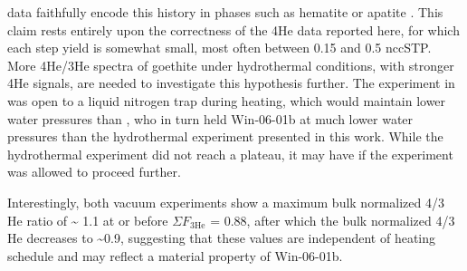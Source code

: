 data faithfully encode this history in phases such as hematite or apatite
\citep{farleymckeon2015,shuster2004}. This claim rests entirely upon the correctness
of the 4He data reported here, for which each step yield is somewhat small, most often
between 0.15 and 0.5 nccSTP. More 4He/3He spectra of goethite under hydrothermal
conditions, with stronger 4He signals, are needed to investigate this hypothesis
further. The experiment in \citet{farley2024} was open to a liquid nitrogen trap during heating, which would
maintain lower water pressures than \citet{monteiro2017}, who in turn held
Win-06-01b at much lower water pressures than the hydrothermal
experiment presented in this work. While the hydrothermal experiment did
not reach a plateau, it may have if the experiment was allowed to
proceed further.

Interestingly, both vacuum experiments show a maximum bulk normalized
4/3 He ratio of \textasciitilde{} 1.1 at or before $\Sigma F_{3\mathrm{He}}$ = 0.88, after
which the bulk normalized 4/3 He decreases to \textasciitilde0.9,
suggesting that these values are independent of heating schedule and may
reflect a material property of Win-06-01b.

